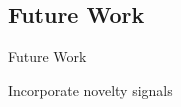 \documentclass[compress]{beamer}
\begin{document}
\subsection{Future Work}
\begin{frame}{Future Work}
    \begin{block}
        {Incorporate novelty signals}
    \end{block}
\end{frame}




\appendix
% 
% 
% 
\begin{frame}
 \titlepage
\end{frame}
\end{document}
